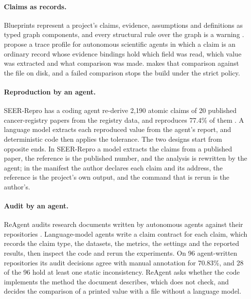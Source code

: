 \paragraph{Claims as records.} Blueprints represent a project's claims, evidence, assumptions and
definitions as typed graph components, and every structural rule over the graph is a warning
\citep{ma2026engineering}. \citet{yin2026observability} propose a trace profile for autonomous
scientific agents in which a claim is an ordinary record whose evidence bindings hold which field
was read, which value was extracted and what comparison was made.  makes that
comparison against the file on disk, and a failed comparison stops the build under the strict
policy.

\paragraph{Reproduction by an agent.} SEER-Repro has a coding agent re-derive 2{,}190 atomic claims
of 20 published cancer-registry papers from the registry data, and reproduces 77.4\% of them
\citep{liu2026seerrepro}. A language model extracts each reproduced value from the agent's
report, and deterministic code then applies the tolerance. The two designs start from opposite
ends. In SEER-Repro a model extracts the claims from a published paper, the reference is the
published number, and the analysis is rewritten by the agent; in the  manifest the
author declares each claim and its address, the reference is the project's own output, and the
command that is rerun is the author's.

\paragraph{Audit by an agent.} ReAgent audits research documents written by autonomous agents
against their repositories \citep{shen2026reagent}. Language-model agents write a claim contract
for each claim, which records the claim type, the datasets, the metrics, the settings and the
reported results, then inspect the code and rerun the experiments. On 96 agent-written
repositories its audit decisions agree with manual annotation for 70.83\%, and 28 of the 96 hold
at least one static inconsistency. ReAgent asks whether the code implements the method the
document describes, which  does not check, and  decides the comparison
of a printed value with a file without a language model.

